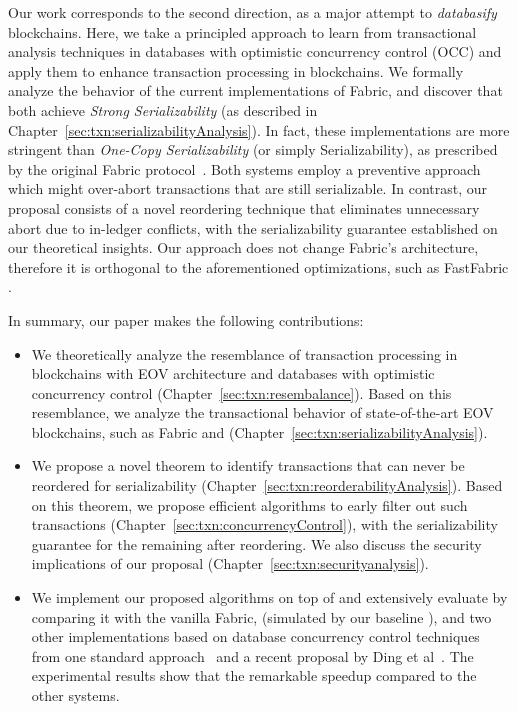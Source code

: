 Our work corresponds to the second direction, as a major attempt to
\textit{databasify} blockchains.
%
Here, we take a principled approach to learn from transactional analysis
techniques in databases with optimistic concurrency control (OCC) and apply them
to enhance transaction processing in blockchains.
%
We formally analyze the behavior of the current implementations of Fabric, and discover that both
achieve \textit{Strong Serializability} \cite{bailis2013highly} (as described in Chapter~\ref{sec:txn:serializabilityAnalysis}).
%
In fact, these implementations are more stringent than
\textit{One-Copy Serializability} (or simply Serializability), as prescribed by the original Fabric protocol~\cite{androulaki2018hyperledger}.
%
Both systems employ a preventive approach which might over-abort transactions that are still serializable.
%
In contrast, our proposal consists of a novel reordering technique that
eliminates unnecessary abort due to in-ledger conflicts, with the serializability guarantee established on our theoretical insights. 
%
Our approach does not change Fabric's architecture, therefore it is orthogonal to the aforementioned optimizations, such as FastFabric \cite{gorenflo2019fastfabric}. 

In summary, our paper makes the following contributions:
\begin{itemize}
\item We theoretically analyze the resemblance of transaction processing in
  blockchains with EOV architecture and databases with optimistic concurrency
  control (Chapter~\ref{sec:txn:resembalance}).
  Based on this resemblance, we analyze the transactional behavior of
  state-of-the-art EOV blockchains, such as Fabric and {\fabricPlusplus}
  (Chapter~\ref{sec:txn:serializabilityAnalysis}).
  
\item We propose a novel theorem to identify transactions that can never be
  reordered for serializability 
  (Chapter~\ref{sec:txn:reorderabilityAnalysis}).
  Based on this theorem, we propose efficient algorithms to early filter out
  such transactions (Chapter~\ref{sec:txn:concurrencyControl}), 
  with the serializability guarantee for the remaining after reordering.
  We also discuss the security implications of our proposal (Chapter~\ref{sec:txn:securityanalysis}).
  

\item We implement our proposed algorithms on top of {\fs} and extensively evaluate {\fs} by comparing it with the vanilla
  Fabric, {\fabricPlusplus}(simulated by our baseline {\fsP}), and two other implementations based on database concurrency control techniques from one standard approach~\cite{CahillRF08} and a recent proposal by Ding et al~\cite{ding2018improving}.
  The experimental results show that the remarkable speedup compared to the other systems.
\end{itemize}

